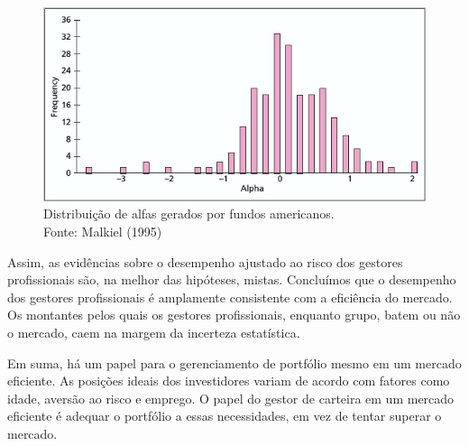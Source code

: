 \begin{figure}[h]
	\centering
	\includegraphics[width=1\linewidth]{figs/fig_gros_alphas}
	\caption[Alfas gerados por fundos americanos.]{Distribuição de alfas gerados por fundos americanos.\\ Fonte: Malkiel (1995)}
	\label{fig:figgrosalphas}
\end{figure}

Assim, as evidências sobre o desempenho ajustado ao risco dos gestores profissionais são, na melhor das hipóteses, mistas. Concluímos que o desempenho dos gestores profissionais é amplamente consistente com a eficiência do mercado. Os montantes pelos quais os gestores profissionais, enquanto grupo, batem ou não o mercado, caem na margem da incerteza estatística.

Em suma, há um papel para o gerenciamento de portfólio mesmo em um mercado eficiente. As posições ideais dos investidores variam de acordo com fatores como idade, aversão ao risco e emprego. O papel do gestor de carteira em um mercado eficiente é adequar o portfólio a essas necessidades, em vez de tentar superar o mercado.


